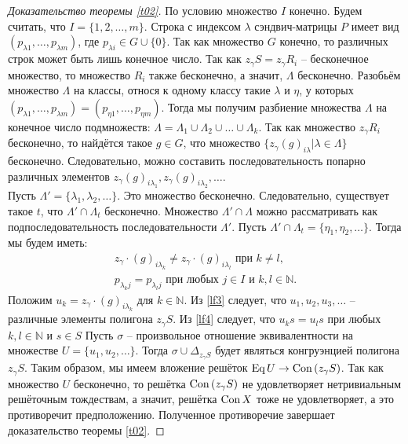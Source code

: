 \documentclass[a4paper]{article}
\newcommand{\Con}{\textnormal{Con}\, }
\newcommand{\Eq}{\textnormal{Eq}\, }
\begin{document}
\begin{proof}[Доказательство теоремы \ref{t02}]
		\par По условию множество $I$ конечно. Будем считать, что $I = \{1,2,\ldots,m\}$. Строка с индексом $\lambda$ сэндвич-матрицы $P$ имеет вид $(p_{\lambda 1},\ldots,p_{\lambda m})$, где $p_{\lambda i} \in G \cup \{0\}$. Так как множество $G$ конечно, то различных строк может быть лишь конечное число. Так как $z_\gamma S = z_\gamma R_i$ -- бесконечное множество, то множество $R_i$ также бесконечно, а значит, $\Lambda$ бесконечно. Разобьём множество $\Lambda$ на классы, относя к одному классу такие $\lambda$ и $\eta$, у которых $(p_{\lambda 1},\ldots,p_{\lambda m}) = (p_{\eta 1},\ldots,p_{\eta m})$. Тогда мы получим разбиение множества $\Lambda$ на конечное число подмножеств: $\Lambda = \Lambda_1 \cup \Lambda_2 \cup \ldots \cup \Lambda_k$. Так как множество $z_\gamma R_i$ бесконечно, то найдётся такое $g \in G$, что множество $\{ z_\gamma (g)_{i \lambda} | \lambda \in \Lambda \}$ бесконечно. Следовательно, можно составить последовательность попарно различных элементов $ z_\gamma (g)_{i \lambda_1}, z_\gamma (g)_{i \lambda_2}, \ldots $.\\
		Пусть $\Lambda' = \{ \lambda_1,\lambda_2, \ldots \}$. Это множество бесконечно. Следовательно, существует такое $t$, что $\Lambda' \cap \Lambda_t$ бесконечно. Множество $\Lambda' \cap \Lambda$ можно рассматривать как подпоследовательность последовательности $\Lambda'$. Пусть $\Lambda' \cap \Lambda_t = \{ \eta_1,\eta_2,\ldots \}$. Тогда мы будем иметь:
		\begin{gather}
			z_\gamma \cdot (g)_{i \lambda_k} \neq z_\gamma \cdot (g)_{i \lambda_l} \text{ при } k \neq l, \label{lf3} \\
			p_{\lambda_k j} = p_{\lambda_l j} \text{ при любых } j \in I \text{ и } k,l \in \mathbb{N}. \label{lf4}
		\end{gather}
		Положим $u_k = z_\gamma \cdot (g)_{i \lambda_k}$ для $k \in \mathbb{N}$. Из \ref{lf3} следует, что $ u_1,u_2,u_3,\ldots $ -- различные элементы полигона $z_\gamma S$. Из \ref{lf4} следует, что $u_k s = u_l s$ при любых $k,l \in \mathbb{N}$ и $s \in S$ Пусть $\sigma$ -- произвольное отношение эквивалентности на множестве $U = \{ u_1,u_2,\ldots \}$. Тогда $\sigma \cup \Delta_{z_\gamma S}$ будет являться конгруэнцией полигона $z_\gamma S$. Таким образом, мы имеем вложение решёток $\Eq U \rightarrow \Con (z_\gamma S)$. Так как множество $U$ бесконечно, то решётка $\Con (z_\gamma S)$ не удовлетворяет нетривиальным решёточным тождествам, а значит, решётка $\Con X$ тоже не удовлетворяет, а это противоречит предположению. Полученное противоречие завершает доказательство теоремы \ref{t02}.
	\end{proof}
	
\end{document}
